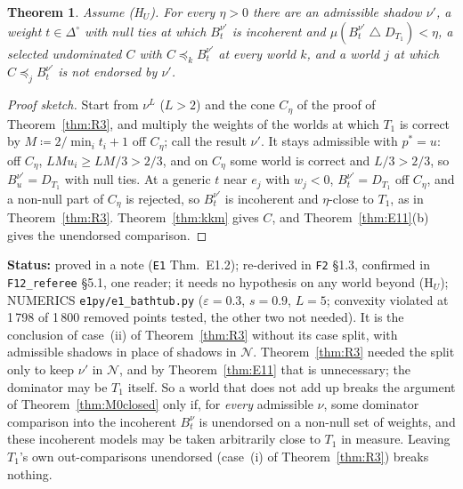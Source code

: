 \documentclass[11pt]{article}
\newtheorem{theorem}{Theorem}[section]
\theoremstyle{definition}
\theoremstyle{remark}
\newcommand{\Di}{\Delta^{\circ}}
\newcommand{\sd}{\mathbin{\triangle}}
\newcommand{\src}[1]{\texttt{#1}}
\newcommand{\status}[1]{\par\smallskip\noindent\textbf{Status:} #1\par\smallskip}
\begin{document}
\begin{theorem}\label{thm:E12}
Assume (H$_U$). For every $\eta>0$ there are an admissible shadow $\nu'$, a weight $t\in\Di$ with null ties at which $B^{\nu'}_t$ is incoherent and $\mu(B^{\nu'}_t\sd D_{T_1})<\eta$, a selected undominated $C$ with $C\preceq_kB^{\nu'}_t$ at every world $k$, and a world $j$ at which $C\preceq_jB^{\nu'}_t$ is not endorsed by $\nu'$.
\end{theorem}
\begin{proof}[Proof sketch]
Start from $\nu^L$ ($L>2$) and the cone $C_\eta$ of the proof of Theorem~\ref{thm:R3}, and multiply the weights of the worlds at which $T_1$ is correct by $M\coloneqq2/\min_it_i+1$ off $C_\eta$; call the result $\nu'$. It stays admissible with $p^*=u$: off $C_\eta$, $LMu_i\ge LM/3>2/3$, and on $C_\eta$ some world is correct and $L/3>2/3$, so $B^{\nu'}_u=D_{T_1}$ with null ties. At a generic $t$ near $e_j$ with $w_j<0$, $B^{\nu'}_t=D_{T_1}$ off $C_\eta$, and a non-null part of $C_\eta$ is rejected, so $B^{\nu'}_t$ is incoherent and $\eta$-close to $T_1$, as in Theorem~\ref{thm:R3}. Theorem~\ref{thm:kkm} gives $C$, and Theorem~\ref{thm:E11}(b) gives the unendorsed comparison.
\end{proof}
\status{proved in a note (\src{E1} Thm.~E1.2); re-derived in \src{F2} \S1.3, confirmed in \src{F12\_referee} \S5.1, one reader; it needs no hypothesis on any world beyond (H$_U$); NUMERICS \src{e1py/e1\_bathtub.py} ($\varepsilon=0.3$, $s=0.9$, $L=5$; convexity violated at 1\,798 of 1\,800 removed points tested, the other two not needed). It is the conclusion of case~(ii) of Theorem~\ref{thm:R3} without its case split, with admissible shadows in place of shadows in $\mathcal N$. Theorem~\ref{thm:R3} needed the split only to keep $\nu'$ in $\mathcal N$, and by Theorem~\ref{thm:E11} that is unnecessary; the dominator may be $T_1$ itself. So a world that does not add up breaks the argument of Theorem~\ref{thm:M0closed} only if, for \emph{every} admissible $\nu$, some dominator comparison into the incoherent $B^\nu_t$ is unendorsed on a non-null set of weights, and these incoherent models may be taken arbitrarily close to $T_1$ in measure. Leaving $T_1$'s own out-comparisons unendorsed (case~(i) of Theorem~\ref{thm:R3}) breaks nothing.}
\end{document}
